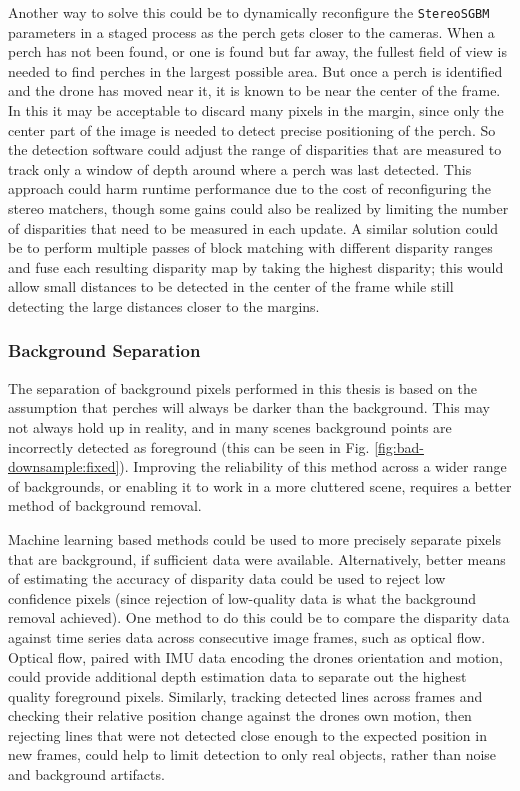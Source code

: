 Another way to solve this could be to dynamically reconfigure the \texttt{StereoSGBM} parameters in 
a staged process as the perch gets closer to the cameras. When a perch has not been found, or one is found but far away, 
the fullest field of view is needed to find perches in the largest possible area. But once a perch is identified and the 
drone has moved near it, it is known to be near the center of the frame. In this it may be acceptable to discard
many pixels in the margin, since only the center part of the image is needed to detect precise positioning of
the perch. So the detection software could adjust the range of disparities that are measured to track only a window of depth
around where a perch was last detected. This approach could harm runtime performance due to the cost of reconfiguring the 
stereo matchers, though some gains could also be realized by limiting the number of disparities that need to be measured 
in each update. A similar solution could be to perform multiple passes of block matching with different disparity ranges
and fuse each resulting disparity map by taking the highest disparity; this would allow small distances to be detected 
in the center of the frame while still detecting the large distances closer to the margins.

\subsubsection{Background Separation}

The separation of background pixels performed in this thesis is based on the assumption that 
perches will always be darker than the background. This may not always hold up in reality, 
and in many scenes background points are incorrectly detected as foreground (this can 
be seen in Fig. \ref{fig:bad-downsample:fixed}). Improving the reliability of this method
across a wider range of backgrounds, or enabling it to work in a more cluttered scene,
requires a better method of background removal.

Machine learning based methods could be used to more precisely separate pixels that are 
background, if sufficient data were available. Alternatively, better means of estimating the 
accuracy of disparity data could be used to reject low confidence pixels (since rejection of 
low-quality data is what the background removal achieved). One method to do this could be
to compare the disparity data against time series data across consecutive image frames, 
such as optical flow. Optical flow, paired with IMU data encoding the drones orientation 
and motion, could provide additional depth estimation data to separate out the highest quality
foreground pixels. Similarly, tracking detected lines across frames and checking their relative 
position change against the drones own motion, then rejecting lines that were not detected close enough
to the expected position in new frames, could help to limit detection to only real objects, rather than 
noise and background artifacts.


